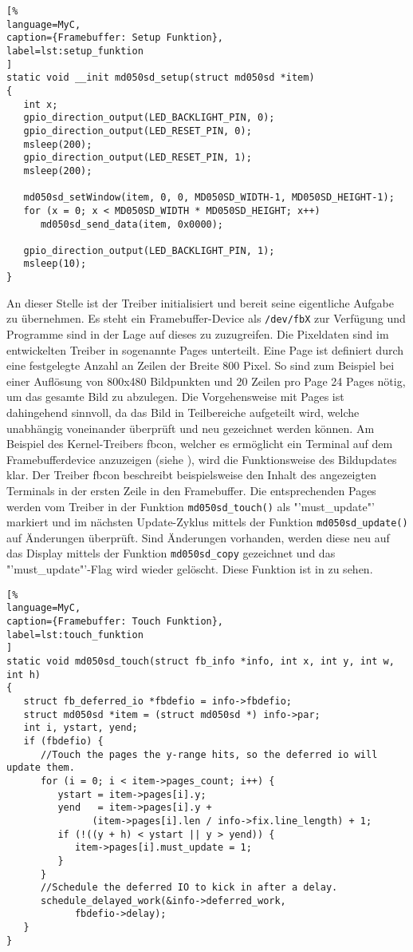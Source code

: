 \begin{lstlisting}[%
language=MyC,
caption={Framebuffer: Setup Funktion},
label=lst:setup_funktion
]
static void __init md050sd_setup(struct md050sd *item)
{
   int x;
   gpio_direction_output(LED_BACKLIGHT_PIN, 0);
   gpio_direction_output(LED_RESET_PIN, 0);
   msleep(200);
   gpio_direction_output(LED_RESET_PIN, 1);
   msleep(200);

   md050sd_setWindow(item, 0, 0, MD050SD_WIDTH-1, MD050SD_HEIGHT-1);
   for (x = 0; x < MD050SD_WIDTH * MD050SD_HEIGHT; x++)
      md050sd_send_data(item, 0x0000);

   gpio_direction_output(LED_BACKLIGHT_PIN, 1);
   msleep(10);
}
\end{lstlisting}

An dieser Stelle ist der Treiber initialisiert und bereit seine eigentliche Aufgabe zu übernehmen. Es steht ein Framebuffer-Device als \lstinline|/dev/fbX| zur Verfügung und Programme sind in der Lage auf dieses zu zuzugreifen.
Die Pixeldaten sind im entwickelten Treiber in sogenannte Pages unterteilt. Eine Page ist definiert durch eine festgelegte Anzahl an Zeilen der Breite 800 Pixel. So sind zum Beispiel bei einer Auflösung von 800x480 Bildpunkten und 20 Zeilen pro Page 24 Pages nötig, um das gesamte Bild zu abzulegen. Die Vorgehensweise mit Pages ist dahingehend sinnvoll, da das Bild in Teilbereiche aufgeteilt wird, welche unabhängig voneinander überprüft und neu gezeichnet werden können. Am Beispiel des Kernel-Treibers fbcon, welcher es ermöglicht ein Terminal auf dem Framebufferdevice anzuzeigen (siehe ), wird die Funktionsweise des Bildupdates klar. Der Treiber fbcon beschreibt beispielsweise den Inhalt des angezeigten Terminals in der ersten Zeile in den Framebuffer. Die entsprechenden Pages werden vom Treiber in der Funktion \lstinline|md050sd_touch()| als "'must\_update"' markiert und im nächsten Update-Zyklus mittels der Funktion \lstinline|md050sd_update()| auf Änderungen überprüft. Sind Änderungen vorhanden, werden diese neu auf das Display mittels der Funktion \lstinline|md050sd_copy| gezeichnet und das "'must\_update"'-Flag wird wieder gelöscht. Diese Funktion ist in
 zu sehen. 
\begin{lstlisting}[%
language=MyC,
caption={Framebuffer: Touch Funktion},
label=lst:touch_funktion
]
static void md050sd_touch(struct fb_info *info, int x, int y, int w, int h)
{
   struct fb_deferred_io *fbdefio = info->fbdefio;
   struct md050sd *item = (struct md050sd *) info->par;
   int i, ystart, yend;
   if (fbdefio) {
      //Touch the pages the y-range hits, so the deferred io will update them.
      for (i = 0; i < item->pages_count; i++) {
         ystart = item->pages[i].y;
         yend   = item->pages[i].y +
               (item->pages[i].len / info->fix.line_length) + 1;
         if (!((y + h) < ystart || y > yend)) {
            item->pages[i].must_update = 1;
         }
      }
      //Schedule the deferred IO to kick in after a delay.
      schedule_delayed_work(&info->deferred_work,
            fbdefio->delay);
   }
}
\end{lstlisting}

